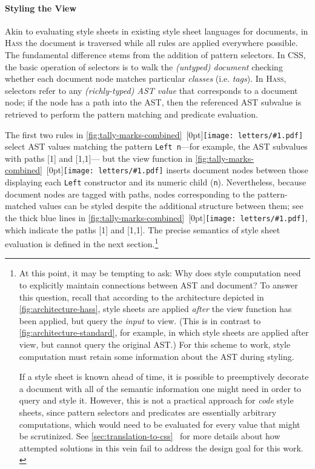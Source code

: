 \documentclass[acmsmall, screen]{acmart}
\newcommand{\parahead}[1]
  {\paragraph{\textbf{#1}}}
\newcommand{\refAppendixTranslationToCss}
  {\autoref{sec:translation-to-css}~\cite{Hass}}
\newcommand{\hass}
{\textsc{Hass}}
\newcommand{\figBubble}[1]{\raisebox{-0.03in}[0pt]{\texttt{[image: letters/\#1.pdf]}}}
\newcommand{\refBubble}[1]
  {~\figBubble{#1}}
\begin{document}
\parahead{Styling the View}





Akin to evaluating style sheets in existing style sheet languages for documents, in \hass{} the document is traversed while all rules are applied everywhere possible.
The fundamental difference stems from the addition of pattern selectors.
In CSS, the basic operation of selectors is to walk the \emph{(untyped) document} checking whether each document node matches particular \emph{classes} (i.e. \emph{tags}).
In \hass{}, selectors refer to any \emph{(richly-typed) AST value} that corresponds to a document node; if the node has a path into the AST, then the referenced AST subvalue is retrieved to perform the pattern matching and predicate evaluation.


The first two rules in \autoref{fig:tally-marks-combined}\refBubble{d} select AST values matching the pattern \texttt{Left n}---for example, the AST subvalues with paths [1] and [1,1]---
but the view function in \autoref{fig:tally-marks-combined}\refBubble{b} inserts document nodes between those displaying each \texttt{Left} constructor and its numeric child (\texttt{n}).
Nevertheless, because document nodes are tagged with paths, nodes corresponding to the pattern-matched values can be styled despite the additional structure between them;
see the thick blue lines in \autoref{fig:tally-marks-combined}\refBubble{b}, which indicate the paths [1] and [1,1].
The precise semantics of style sheet evaluation is defined in the next section.\footnote{
At this point, it may be tempting to ask:
Why does style computation need to explicitly maintain connections between AST and document?
To answer this question, recall that according to the architecture depicted in \autoref{fig:architecture-hass}, style sheets are applied \emph{after} the view function has been applied, but query the \emph{input} to view. (This is in contrast to \autoref{fig:architecture-standard}, for example, in which style sheets are applied after view, but cannot query the original AST.)
For this scheme to work, style computation must retain some information about the AST during styling.

If a style sheet is known ahead of time, it is possible to preemptively decorate a document with all of the semantic information one might need in order to query and style it.
However, this is not a practical approach for \emph{code} style sheets, since pattern selectors and predicates are essentially arbitrary computations, which would need to be evaluated for every value that might be scrutinized.
See \refAppendixTranslationToCss{} for more details about how attempted solutions in this vein fail to address the design goal for this work.
\label{footnote:translation-to-css}
}
\end{document}
